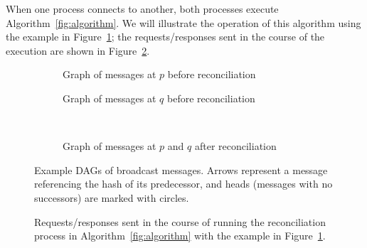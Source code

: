\documentclass[a4paper,anonymous,USenglish]{lipics-v2019}
\begin{document}
When one process connects to another, both processes execute Algorithm~\ref{fig:algorithm}.
We will illustrate the operation of this algorithm using the example in Figure~\ref{fig:example-dags}; the requests/responses sent in the course of the execution are shown in Figure~\ref{fig:messages}.

\begin{figure}[p]
    \centering
    \begin{subfigure}{0.45\textwidth}
    
    \caption{Graph of messages at $p$ before reconciliation}
    \end{subfigure}\hfill
    \begin{subfigure}{0.45\textwidth}
    
    \caption{Graph of messages at $q$ before reconciliation}
    \end{subfigure}\\[10pt]
    \begin{subfigure}{0.4\textwidth}
    
    \caption{Graph of messages at $p$ and $q$ after reconciliation}
    \end{subfigure}
    \caption{Example DAGs of broadcast messages. Arrows represent a message referencing the hash of its predecessor, and heads (messages with no successors) are marked with circles.}
    \label{fig:example-dags}
\end{figure}

\begin{figure}[p]
    
    \caption{Requests/responses sent in the course of running the reconciliation process in Algorithm~\ref{fig:algorithm} with the example in Figure~\ref{fig:example-dags}.}
    \label{fig:messages}
\end{figure}
\end{document}
